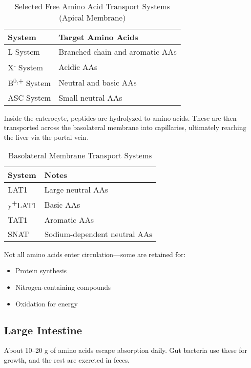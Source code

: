 \documentclass{tufte-handout}
\begin{document}
\begin{table}[h]
\caption{Selected Free Amino Acid Transport Systems (Apical Membrane)}
\begin{tabular}{ll}
\toprule
\textbf{System} & \textbf{Target Amino Acids} \\
\midrule
L System & Branched-chain and aromatic AAs \\
X\textsuperscript{-} System & Acidic AAs \\
B\textsuperscript{0,+} System & Neutral and basic AAs \\
ASC System & Small neutral AAs \\
\bottomrule
\end{tabular}
\end{table}


Inside the enterocyte, peptides are hydrolyzed to amino acids. These are then transported across the basolateral membrane into capillaries, ultimately reaching the liver via the portal vein.

\begin{table}[h]
\caption{Basolateral Membrane Transport Systems}
\begin{tabular}{ll}
\toprule
\textbf{System} & \textbf{Notes} \\
\midrule
LAT1 & Large neutral AAs \\
y\textsuperscript{+}LAT1 & Basic AAs \\
TAT1 & Aromatic AAs \\
SNAT & Sodium-dependent neutral AAs \\
\bottomrule
\end{tabular}
\end{table}

Not all amino acids enter circulation—some are retained for:
\begin{itemize}
  \item Protein synthesis
  \item Nitrogen-containing compounds
  \item Oxidation for energy
\end{itemize}

\subsection{Large Intestine}
About 10–20 g of amino acids escape absorption daily. Gut bacteria use these for growth, and the rest are excreted in feces.
\end{document}
